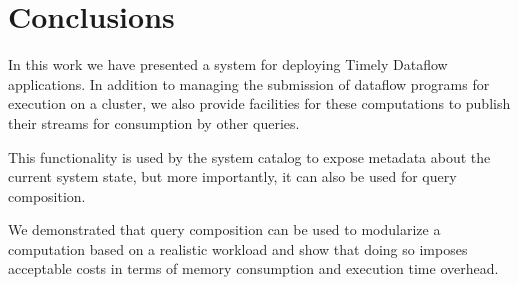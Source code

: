 \clearpage
\section{Conclusions}


In this work we have presented a system for deploying Timely Dataflow applications.
In addition to managing the submission of dataflow programs for execution
on a cluster, we also provide facilities for these computations to publish
their streams for consumption by other queries. 

This functionality is used by the
system catalog to expose metadata about the current system state, but more
importantly, it can also be used for query composition.

We demonstrated that query composition can be used to modularize a computation
based on a realistic workload and show that doing so imposes acceptable costs
in terms of memory consumption and execution time overhead.


